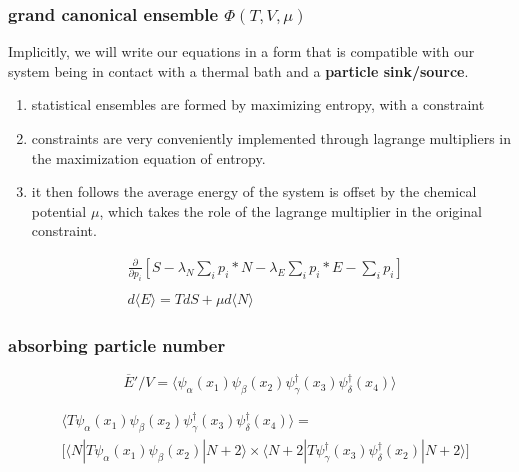 \documentclass{beamer}
\begin{document}
\begin{frame}
\frametitle{grand canonical ensemble $\Phi(T,V,\mu)$}
Implicitly, we will write our equations in a form that is compatible with our system being in contact with a thermal bath and a \textbf{particle sink/source}. \\
\begin{enumerate}
\item{statistical ensembles are formed by maximizing entropy, with a constraint}
\item{constraints are very conveniently implemented through lagrange multipliers in the maximization equation of entropy.}
\item{it then follows the average energy of the system is offset by the chemical potential $\mu$, which takes the role of the lagrange multiplier in the original constraint.}
\end{enumerate}
\begin{eqnarray*}
& \frac{\partial}{\partial p_i}\left[S - \lambda_N \sum_i p_i*N - \lambda_E\sum_i p_i*E - \sum_i p_i\right] \\
\\
& d\langle E\rangle = TdS + \mu d\langle N\rangle 
\end{eqnarray*}
\end{frame}
\begin{frame}
\frametitle{absorbing particle number}
\begin{equation*}
\overline{E}'/V = \langle \psi_{\alpha}(x_1) \psi_{\beta}(x_2) \psi_{\gamma}^{\dagger}(x_3) \psi_{\delta}^{\dagger}(x_4) \rangle
\end{equation*}

\begin{eqnarray*}
& \langle T \psi_{\alpha}(x_1) \psi_{\beta}(x_2) \psi_{\gamma}^{\dagger}(x_3) \psi_{\delta}^{\dagger}(x_4) \rangle = \\ 
& \big[\langle N|T \psi_{\alpha}(x_1)\psi_{\beta}(x_2)|N+2\rangle \times \langle N+2|T \psi_{\gamma}^{\dagger}(x_3)\psi_{\delta}^{\dagger}(x_2)|N+2\rangle\big]
\end{eqnarray*}
\end{frame}

\end{document}
